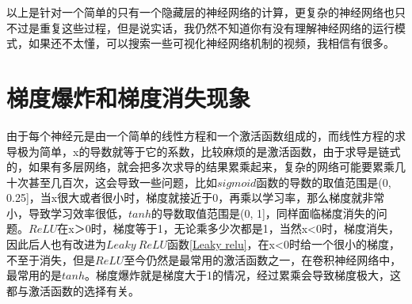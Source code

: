 \documentclass[a5paper, 11pt]{ctexbook}
\begin{document}
以上是针对一个简单的只有一个隐藏层的神经网络的计算，更复杂的神经网络也只不过是重复这些过程，但是说实话，我仍然不知道你有没有理解神经网络的运行模式，如果还不太懂，可以搜索一些可视化神经网络机制的视频，我相信有很多。

\section{梯度爆炸和梯度消失现象}

由于每个神经元是由一个简单的线性方程和一个激活函数组成的，而线性方程的求导极为简单，x的导数就等于它的系数，比较麻烦的是激活函数，由于求导是链式的，如果有多层网络，就会把多次求导的结果累乘起来，复杂的网络可能要累乘几十次甚至几百次，这会导致一些问题，比如$sigmoid$函数的导数的取值范围是(0, 0.25]，当x很大或者很小时，梯度就接近于0，再乘以学习率，那么梯度就非常小，导致学习效率很低，$tanh$的导数取值范围是(0, 1]，同样面临梯度消失的问题。$ReLU$在x＞0时，梯度等于1，无论乘多少次都是1，当然x<0时，梯度消失，因此后人也有改进为$Leaky~ReLU$函数\ref{Leaky relu}，在x<0时给一个很小的梯度，不至于消失，但是$ReLU$至今仍然是最常用的激活函数之一，在卷积神经网络中，最常用的是$tanh$。梯度爆炸就是梯度大于1的情况，经过累乘会导致梯度极大，这都与激活函数的选择有关。
\end{document}
